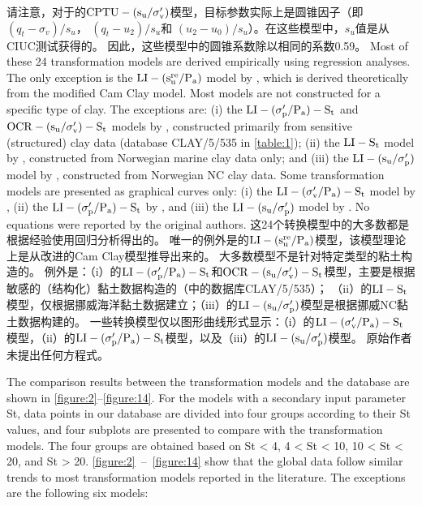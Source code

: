 \begin{Parallel}{0.60\textwidth}{}
{        请注意，对于\citet{Ching201252}的$\rm{CPTU}-(s_u/\sigma_v')$模型，目标参数实际上是圆锥因子（即$(q_t-\sigma_v)/s_u$， $(q_t-u_2)/s_u$和 $(u_2-u_0)/s_u$）。在这些模型中，$s_u$值是从CIUC测试获得的。 因此，这些模型中的圆锥系数除以相同的系数0.59。
    }
    \ParallelPar
    \ParallelLText
    {
        Most of these 24 transformation models are derived empirically using regression analyses. The only exception is the $\rm{LI}-(s_u^{re}/P_a)$ model by \citet{Wroth1978137}, which is derived  theoretically from the modified Cam Clay model. Most models are not constructed for a specific type of clay. The exceptions are: (i) the $\rm{LI}-(\sigma_p'/P_a)-S_t$ and $\rm{OCR}-(s_u/\sigma_v')-S_t$ models by \citet{Ching2012522}, constructed primarily from sensitive (structured) clay data (database CLAY/5/535 in \autoref{table:1}); (ii) the $\rm{LI}-S_t$ model by \citet{Bjerrum195449}, constructed from Norwegian marine clay data only; and (iii) the $\rm{LI}-(s_u/\sigma_p')$ model by \citet{Bjerrum1960711}, constructed from Norwegian NC clay data. Some transformation models are presented as graphical curves only: (i) the $\rm{LI}-(\sigma_v'/P_a)-S_t$ model by \citet{Mitchell1993}, (ii) the $\rm{LI}-(\sigma_p'/P_a)-S_t$ by \citet{NAVFAC1982}, and (iii) the $\rm{LI}-(s_u/\sigma_p')$ model by \citet{Bjerrum1960711}. No equations were reported by the original authors.
    }
    \ParallelRText
    {
        这24个转换模型中的大多数都是根据经验使用回归分析得出的。 唯一的例外是\citet{Wroth1978137}的$\rm{LI}-(s_u^{re}/P_a)$模型，该模型理论上是从改进的Cam Clay模型推导出来的。 大多数模型不是针对特定类型的粘土构造的。 例外是：（i）\citet{Ching2012522}的$\rm{LI}-(\sigma_p'/P_a)-S_t$和$\rm{OCR}-(s_u/\sigma_v')-S_t$模型，主要是根据敏感的（结构化）黏土数据构造的（中的数据库CLAY/5/535）； （ii）\citet{Bjerrum195449}的$\rm{LI}-S_t$模型，仅根据挪威海洋黏土数据建立；（iii）\citet{Bjerrum1960711}的$\rm{LI}-(s_u/\sigma_p')$模型是根据挪威NC黏土数据构建的。 一些转换模型仅以图形曲线形式显示：（i）\citet{Mitchell1993}的$\rm{LI}-(\sigma_v'/P_a)-S_t$模型，（ii）\citet{NAVFAC1982}的$\rm{LI}-(\sigma_p'/P_a)-S_t$模型，以及（iii）\citet{Bjerrum1960711}的$\rm{LI}-(s_u/\sigma_p')$模型。 原始作者未提出任何方程式。
    }
    \ParallelPar
    
    \ParallelLText
    {
        The comparison results between the transformation models and the database are shown in \autoref{figure:2}–\autoref{figure:14}. For the models with a secondary input parameter St, data points in our database are divided into four groups according to their St values, and four subplots are presented to compare with the transformation models. The four groups are obtained based on St < 4, 4 < St < 10, 10 < St < 20, and St > 20. \autoref{figure:2}~–~\autoref{figure:14} show that the global data follow similar trends to most transformation models reported in the literature. The exceptions are the following six models:

}
\end{Parallel}
